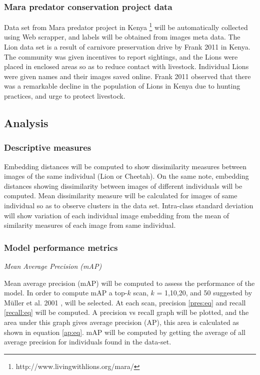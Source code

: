 \subsubsection{Mara predator conservation project data}
Data set from Mara predator project in Kenya \footnote{http://www.livingwithlions.org/mara/}  will be automatically collected using Web scrapper, and labels will be obtained from images meta data. The Lion data set is a result of carnivore preservation drive by Frank 2011 \cite{frank2011living} in Kenya. The community was given incentives to report sightings, and the Lions were placed in enclosed areas so as to reduce contact with livestock. Individual Lions were given names and their images saved online. Frank 2011 observed that there was a remarkable decline in the population of Lions in Kenya due to hunting practices, and urge to protect livestock.  
\subsection{Analysis}
\subsubsection{Descriptive measures }
Embedding distances will be computed to show dissimilarity measures between images of the same individual (Lion or Cheetah). On the same note, embedding distances showing dissimilarity between images of different individuals will be computed. Mean dissimilarity measure will be calculated for images of same individual so as to observe clusters in the data set. Intra-class standard deviation will show variation of each individual image embedding from the mean of similarity measures of each image from same individual.  

\subsubsection{Model performance  metrics}
\textit{Mean Average Precision (mAP)}\newline

Mean average precision (mAP) will be computed to assess the performance of the model. In order to compute mAP a top-$k$ scan, $k$ = 1,10,20, and 50 suggested by M{\"u}ller et al. 2001 \cite{muller2001performance}, will be selected. At each scan, precision \ref{pres:eq} and recall \ref{recall:eq} will be computed. A precision vs recall graph will be plotted, and the area under this graph gives average precision (AP), this area is calculated as shown in equation \ref{ap:eq}.  mAP  will be computed by getting the average of all average precision for individuals found in the data-set.

